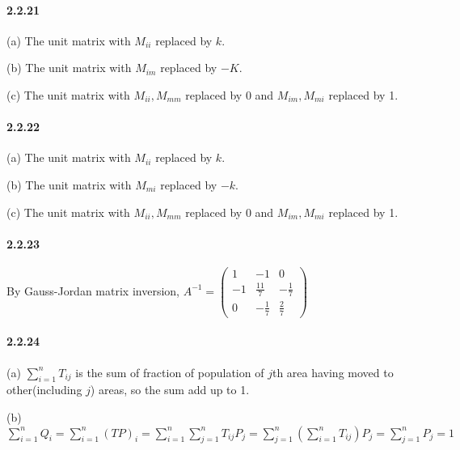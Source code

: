 \documentclass[a4paper]{article}
\begin{document}
\paragraph{2.2.21}
(a) The unit matrix with $M_{ii}$ replaced by $k$.

(b) The unit matrix with $M_{im}$ replaced by $-K$.

(c) The unit matrix with $M_{ii},M_{mm}$ replaced by 0 and $M_{im},M_{mi}$ replaced by 1.

\paragraph{2.2.22}
(a) The unit matrix with $M_{ii}$ replaced by $k$.

(b) The unit matrix with $M_{mi}$ replaced by $-k$.

(c) The unit matrix with $M_{ii},M_{mm}$ replaced by 0 and $M_{im},M_{mi}$ replaced by 1.

\paragraph{2.2.23}
By Gauss-Jordan matrix inversion, $A^{-1}=
\begin{pmatrix}
1&-1&0\\
-1&\frac{11}{7}&-\frac{1}{7}\\
0&-\frac{1}{7}&\frac{2}{7}
\end{pmatrix}
$

\paragraph{2.2.24}
(a) $\sum_{i=1}^nT_{ij}$ is the sum of fraction of population of $j$th area having moved to other(including $j$) areas, so the sum add up to 1.

(b) $\sum_{i=1}^nQ_i=\sum_{i=1}^n(TP)_i=\sum_{i=1}^n\sum_{j=1}^n T_{ij}P_j=\sum_{j=1}^n\left(\sum_{i=1}^nT_{ij} \right)P_j=\sum_{j=1}^nP_j=1$
\end{document}
